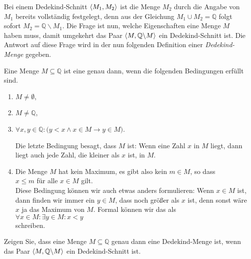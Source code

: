 Bei einem Dedekind-Schnitt $\pair(M_1,M_2)$ ist die Menge $M_2$ durch die Angabe von
$M_1$ bereits vollständig festgelegt, denn aus der Gleichung $M_1 \cup M_2 = \mathbb{Q}$ folgt
sofort $M_2 = \mathbb{Q} \backslash M_1$.  Die Frage ist nun, welche Eigenschaften eine Menge $M$
haben muss, damit umgekehrt das Paar $\pair(M, \mathbb{Q} \backslash M)$ ein Dedekind-Schnitt ist.
Die Antwort auf diese Frage wird in der nun folgenden Definition einer \emph{Dedekind-Menge} gegeben.


\begin{Definition}
Eine Menge $M \subseteq \mathbb{Q}$ ist eine  genau dann, wenn die
folgenden Bedingungen erfüllt sind.
\begin{enumerate}
\item $M \not= \emptyset$,
\item $M \not= \mathbb{Q}$,
\item $\forall x, y \in \mathbb{Q}: \bigl(y < x \wedge x \in M \rightarrow y \in M)$.

      Die letzte Bedingung besagt, dass $M$  ist:  Wenn eine
      Zahl $x$ in $M$ liegt, dann liegt auch jede Zahl, die kleiner als $x$ ist, in $M$.
\item Die Menge $M$ hat kein Maximum, es gibt also kein $m \in M$, so dass
      \\[0.2cm]
      \hspace*{1.3cm}
      $x \leq m$ \quad für alle $x \in M$ gilt.
      \\[0.2cm]
      Diese Bedingung können wir auch etwas anders formulieren:  Wenn $x \in M$ ist, dann finden wir
      immer ein $y \in M$, dass noch größer als $x$ ist, denn sonst wäre $x$ ja das Maximum von $M$.
      Formal können wir das als
      \\[0.2cm]
      \hspace*{1.3cm}
      $\forall x \in M: \exists y \in M: x < y$
      \\[0.2cm]
      schreiben.
\end{enumerate}
\end{Definition}

\exercise
Zeigen Sie, dass eine Menge $M \subseteq \mathbb{Q}$ genau dann eine Dedekind-Menge ist, wenn das Paar $\pair(M,\mathbb{Q} \backslash M)$
ein Dedekind-Schnitt ist. \eox

